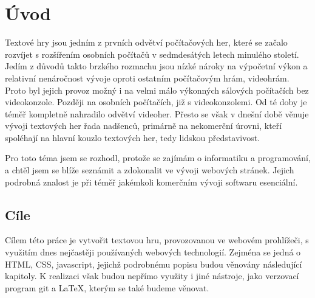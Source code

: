 \documentclass[main.tex]{subfiles}
\begin{document}
\section{Úvod}
Textové hry jsou jedním z prvních odvětví počítačových her, které se začalo rozvíjet s rozšířením osobních počítačů v sedmdesátých letech minulého století. Jedím z důvodů takto brzkého rozmachu jsou nízké nároky na výpočetní výkon a relativní nenáročnost vývoje oproti ostatním počítačovým hrám, videohrám. Proto byl jejich provoz možný i na velmi málo výkonných sálových počítačích bez videokonzole. Později na osobních počítačích, již s videokonzolemi. \cite{web:pcmag:en:oldcomputergames}
 Od té doby je téměř kompletně nahradilo odvětví videoher. Přesto se však v dnešní době věnuje vývoji textových her řada nadšenců, primárně na nekomerční úrovni, kteří spoléhají na hlavní kouzlo textových her, tedy lidskou představivost. \cite{web:wik:en:textgame}

Pro toto téma jsem se rozhodl, protože se zajímám o informatiku a programování, a chtěl jsem se blíže seznámit a zdokonalit ve vývoji webových stránek. Jejich podrobná znalost je při téměř jakémkoli komerčním vývoji softwaru esenciální.

\subsection{Cíle}
Cílem této práce je vytvořit textovou hru, provozovanou ve webovém prohlížeči, s využitím dnes nejčastěji používaných webových technologií. Zejména se jedná o HTML, CSS, javascript, jejichž podrobnému popisu budou věnovány následující kapitoly. K realizaci však budou nepřímo využity i jiné nástroje, jako verzovací program git a \LaTeX, kterým se také budeme věnovat.
\end{document}
